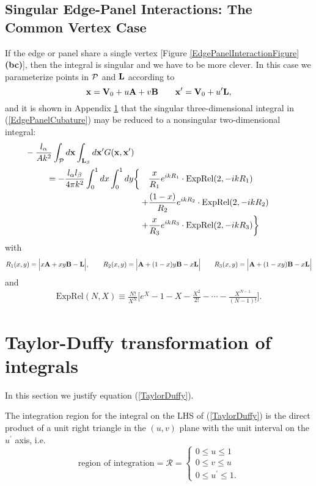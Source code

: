 \documentclass[letterpaper]{article}
\begin{document}
\subsection*{Singular Edge-Panel Interactions: The Common Vertex Case}

If the edge or panel share a single vertex 
[Figure \ref{EdgePanelInteractionFigure}\textbf{(bc)}],
then the integral is singular and we have to be more clever.
In this case we parameterize points in $\mathcal{P}$ and $\mathbf{L}$ 
according to
$$ \mathbf{x} = \mathbf{V}_0 + u\mathbf{A} + v\mathbf{B}
   \qquad
   \mathbf{x}^\prime = \mathbf{V}_0 + u^\prime \mathbf{L},
$$
and it is shown in Appendix \ref{EdgePanelAppendix}
that the singular three-dimensional integral in (\ref{EdgePanelCubature})
may be reduced to a nonsingular two-dimensional integral:
\begin{align}
&\hspace{-2in}
 -\frac{l_\alpha}{Ak^2}
   \int_{\pan} d\vb x \int_{\vb L_\beta} d\vb x^\prime
   G(\vb x, \vb x^\prime)
\\
 =
 -\frac{l_\alpha l_\beta}{4\pi k^2}\int_0^1 dx \int_0^1 dy \bigg\{
 \quad &\frac{x}{R_1} e^{ikR_1} \cdot \text{ExpRel}(2,-ikR_1)
\\
      +&\frac{(1-x)}{R_2} e^{ikR_2} \cdot \text{ExpRel}(2,-ikR_2)
\\
      +&\frac{x}{R_3}e^{ikR_3} \cdot \text{ExpRel}(2,-ikR_3)
  \bigg\}
\end{align}
with
$$ R_1(x,y)=\Big| x\mathbf{A} + xy \mathbf{B} - \mathbf{L} \Big|,
   \qquad
   R_2(x,y)=\Big| \mathbf{A} + (1-x)y \mathbf{B} - x\mathbf{L}\Big|
   \qquad
   R_3(x,y)=\Big| \mathbf{A} + (1-xy) \mathbf{B} - x\mathbf{L}\Big|
$$
and
\begin{align*}
 \text{ExpRel}(N,X) \equiv
 \frac{N!}{X^N}\Big[e^{X} - 1 - X - \frac{X^2}{2!} - \cdots 
                             - \frac{X^{N-1}}{(N-1)!} \Big].
\end{align*}

\appendix
\newpage
\section{Taylor-Duffy transformation of integrals}
\label{EdgePanelAppendix}

In this section we justify equation 
(\ref{TaylorDuffy}).

The integration region for the integral on the LHS of 
(\ref{TaylorDuffy}) is the direct product of a unit
right triangle in the $(u,v)$ plane with the unit 
interval on the $u^\prime$ axis, i.e. 
$$\text{region of integration}=\mathcal{R}=
  \begin{cases}
  0\le u \le 1 \\
  0\le v \le u \\
  0\le u^\prime \le 1.
  \end{cases}
$$
\end{document}
